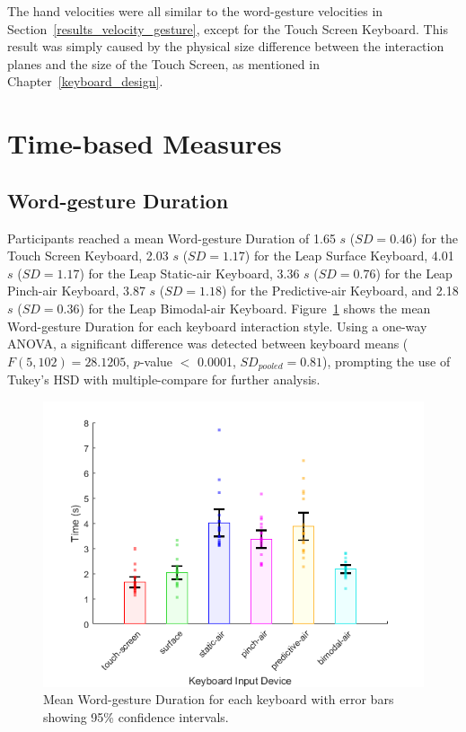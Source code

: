 The hand velocities were all similar to the word-gesture velocities in Section~\ref{results_velocity_gesture}, except for the Touch Screen Keyboard. This result was simply caused by the physical size difference between the interaction planes and the size of the Touch Screen, as mentioned in Chapter~\ref{keyboard_design}.

\section{Time-based Measures}

\subsection{Word-gesture Duration}
Participants reached a mean Word-gesture Duration of 1.65 $s$ ($SD = 0.46$) for the Touch Screen Keyboard, 2.03 $s$ ($SD = 1.17$) for the Leap Surface Keyboard, 4.01 $s$ ($SD = 1.17$) for the Leap Static-air Keyboard, 3.36 $s$ ($SD = 0.76$) for the Leap Pinch-air Keyboard, 3.87 $s$ ($SD = 1.18$) for the Predictive-air Keyboard, and 2.18 $s$ ($SD = 0.36$) for the Leap Bimodal-air Keyboard. Figure~\ref{fig_time_mean} shows the mean Word-gesture Duration for each keyboard interaction style. Using a one-way ANOVA, a significant difference was detected between keyboard means ($F(5, 102) = 28.1205$, $p$-value $<$ 0.0001, $SD_{pooled} = 0.81$), prompting the use of Tukey's HSD with multiple-compare for further analysis.

\begin{figure}[!b]
	\centering
	\includegraphics{Figures/fig_time_mean}
	\caption[Mean Word-gesture Duration]{Mean Word-gesture Duration for each keyboard with error bars showing 95\% confidence intervals.}
	\label{fig_time_mean}
\end{figure}

